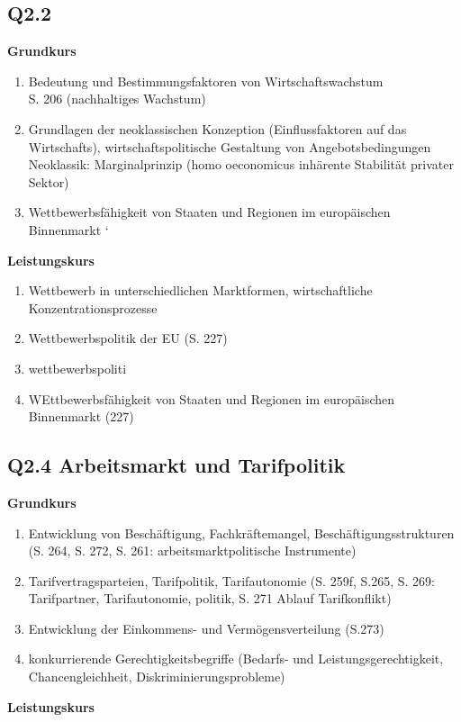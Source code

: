 \documentclass[12pt, letterpaper]{article}
\begin{document}
\subsection{Q2.2}
\label{sec:Q2.2}
\textbf{Grundkurs} 
\begin{enumerate}
  \item Bedeutung und Bestimmungsfaktoren von Wirtschaftswachstum \\
    S. 206 (nachhaltiges Wachstum)
  \item Grundlagen der neoklassischen Konzeption (Einflussfaktoren auf das Wirtschafts), wirtschaftspolitische Gestaltung von Angebotsbedingungen \\
    Neoklassik: Marginalprinzip (homo oeconomicus inhärente Stabilität privater Sektor)
  \item Wettbewerbsfähigkeit von Staaten und Regionen im europäischen Binnenmarkt
    `
\end{enumerate}
\textbf{Leistungskurs}
\begin{enumerate}
  \item Wettbewerb in unterschiedlichen Marktformen, wirtschaftliche Konzentrationsprozesse
  \item Wettbewerbspolitik der EU (S. 227)

  \item wettbewerbspoliti
  \item WEttbewerbsfähigkeit von Staaten und Regionen im europäischen Binnenmarkt (227)
\end{enumerate}

\subsection{Q2.4 Arbeitsmarkt und Tarifpolitik}
\textbf{Grundkurs} 
\begin{enumerate}
  \item  Entwicklung von Beschäftigung, Fachkräftemangel, Beschäftigungsstrukturen (S. 264, S. 272, S. 261: arbeitsmarktpolitische Instrumente)
  \item Tarifvertragsparteien, Tarifpolitik, Tarifautonomie (S. 259f, S.265, S. 269: Tarifpartner, Tarifautonomie, politik, S. 271 Ablauf Tarifkonflikt)
  \item Entwicklung der Einkommens- und Vermögensverteilung (S.273)
  \item konkurrierende Gerechtigkeitsbegriffe (Bedarfs- und  Leistungsgerechtigkeit, Chancengleichheit, Diskriminierungsprobleme)\\
  


\end{enumerate}
\textbf{Leistungskurs} 
\label{sec:Q2.4}
\end{document}
